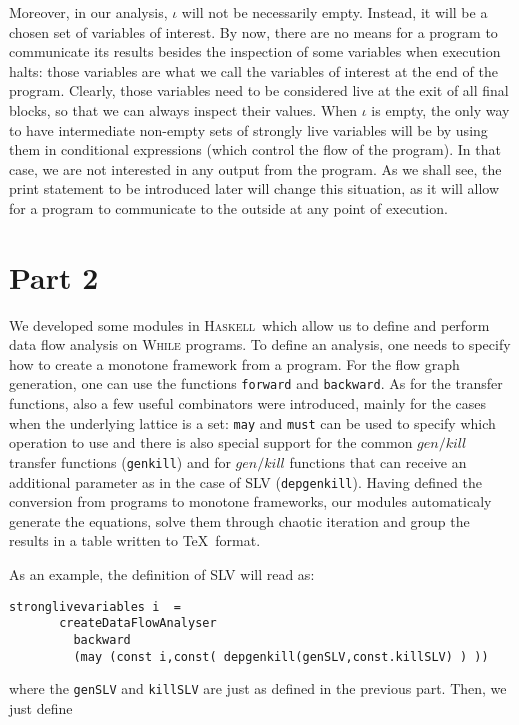 \documentclass[a4wide,12pt]{article}
\def\haskell{\textsc{Haskell}}
\def\hs#1{\texttt{#1}}
\begin{document}
Moreover, in our analysis, $\iota$ will not be necessarily empty. Instead, it will be a chosen set of
variables of interest.
By now, there are no means for a program
to communicate its results besides the inspection of some variables when execution halts: those variables
are what we call the variables of interest at the end of the program. Clearly,
those variables need to be considered live at the exit of all final blocks, so that we can always inspect their values.
When $\iota$ is empty, the only way to have intermediate
non-empty sets of strongly live variables will be by using them in conditional expressions (which control the
flow of the program). In that case, we are not interested in any output from the program.
As we shall see, the print statement
to be introduced later will change this situation, as it will allow for
a program to communicate to the outside at any point of execution. 
 
\section{Part 2}
 
We developed some modules in \haskell\ which allow us to define and perform
data flow analysis on \textsc{While} programs. To define an analysis,
one needs to specify how to create a monotone framework from a program.
For the flow graph generation, one can use the functions \hs{forward} and \hs{backward}.
As for the transfer functions, also a few useful combinators were introduced, mainly
for the cases when the underlying lattice is a set: \hs{may} and \hs{must}
can be used to specify which operation to use and there is also special support
for the common $gen/kill$ transfer functions (\hs{genkill}) and for
$gen/kill$ functions that can receive an additional parameter as in the case of SLV
(\hs{depgenkill}). Having defined the conversion from programs to monotone frameworks,
our modules automaticaly generate the equations, solve them through chaotic iteration
and group the results in a table written to \TeX\ format. 

As an example, the definition of SLV will read as:

{\small
\begin{verbatim}
stronglivevariables i  =
       createDataFlowAnalyser
         backward
         (may (const i,const( depgenkill(genSLV,const.killSLV) ) ))
\end{verbatim}
}

\noindent
where the \hs{genSLV} and \hs{killSLV} are just as defined in the previous part. Then, we just define
\end{document}
